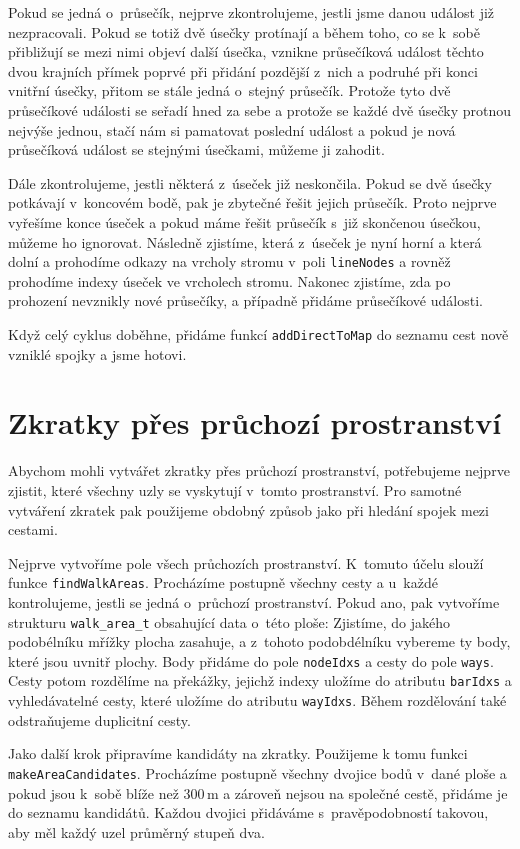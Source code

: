 Pokud se jedná o~průsečík, nejprve zkontrolujeme, jestli jsme danou událost již
nezpracovali. Pokud se totiž dvě úsečky protínají a během toho, co se k~sobě
přibližují se mezi nimi objeví další úsečka, vznikne průsečíková událost těchto
dvou krajních přímek poprvé při přidání pozdější z~nich a podruhé při konci
vnitřní úsečky, přitom se stále jedná o~stejný průsečík. Protože tyto dvě
průsečíkové události se seřadí hned za sebe a protože se každé dvě úsečky
protnou nejvýše jednou, stačí nám si pamatovat poslední událost a pokud je nová
průsečíková událost se stejnými úsečkami, můžeme ji zahodit.

Dále zkontrolujeme, jestli některá z~úseček již neskončila. Pokud se dvě úsečky
potkávají v~koncovém bodě, pak je zbytečné řešit jejich průsečík. Proto nejprve
vyřešíme konce úseček a pokud máme řešit průsečík s~již skončenou úsečkou,
můžeme ho ignorovat. Následně zjistíme, která z~úseček je nyní horní a která
dolní a prohodíme odkazy na vrcholy stromu v~poli \verb|lineNodes| a rovněž
prohodíme indexy úseček ve vrcholech stromu. Nakonec zjistíme, zda po prohození
nevznikly nové průsečíky, a případně přidáme průsečíkové události.

Když celý cyklus doběhne, přidáme funkcí \verb|addDirectToMap| do seznamu cest
nově vzniklé spojky a jsme hotovi.


\section{Zkratky přes průchozí prostranství}
Abychom mohli vytvářet zkratky přes průchozí prostranství, potřebujeme nejprve
zjistit, které všechny uzly se vyskytují v~tomto prostranství. Pro samotné
vytváření zkratek pak použijeme obdobný způsob jako při hledání spojek mezi
cestami. 

Nejprve vytvoříme pole všech průchozích prostranství.  K~tomuto účelu
slouží funkce \verb|findWalkAreas|. Procházíme postupně všechny cesty a u~každé
kontrolujeme, jestli se jedná o~průchozí prostranství. Pokud ano, pak vytvoříme
strukturu \verb|walk_area_t| obsahující data o~této ploše: Zjistíme, do jakého
podobélníku mřížky plocha zasahuje, a z~tohoto podobdélníku vybereme ty body,
které jsou uvnitř plochy. Body přidáme do pole \verb|nodeIdxs| a cesty do pole
\verb|ways|. Cesty potom rozdělíme na překážky, jejichž indexy uložíme do
atributu \verb|barIdxs| a vyhledávatelné cesty, které uložíme do atributu
\verb|wayIdxs|. Během rozdělování také odstraňujeme duplicitní cesty. 

Jako další krok připravíme kandidáty na zkratky. Použijeme k tomu funkci
\verb|makeAreaCandidates|. Procházíme postupně všechny dvojice bodů v~dané ploše
a pokud jsou k~sobě blíže než 300\,m a zároveň nejsou na společné cestě, přidáme
je do seznamu kandidátů. Každou dvojici přidáváme s~pravěpodobností takovou, aby
měl každý uzel průměrný stupeň dva.

